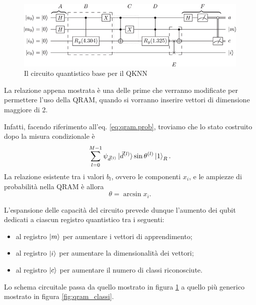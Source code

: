 \begin{figure}[h]
    \centering
    \includegraphics[width=\linewidth]{gfx/schuld_circuito}
    \caption{Il circuito quantistico base per il QKNN}
    \label{fig:circuito_schuld}
\end{figure}

La relazione appena mostrata è una delle prime che verranno modificate per permettere 
l'uso della \ac{QRAM}, quando si vorranno inserire vettori di dimensione maggiore di 2. 

Infatti, facendo riferimento all'eq. \ref{eq:qram.prob}, troviamo che lo stato costruito 
dopo la misura condizionale è 
\begin{equation}
    \sum_{l=0}^{M-1} \psi_{\vec{d}^{(l)}}\ket{\vec{d}^{(l)}}\sin\theta^{(l)}\ket{1}_R. 
\end{equation}
La relazione esistente tra i valori $b_l$, ovvero le componenti $x_i$, 
e le ampiezze di probabilità nella \ac{QRAM} è allora
\begin{equation} \label{eq:angolo.qram}
    \theta = \arcsin x_i. 
\end{equation}

L'espansione delle capacità del circuito prevede dunque l'aumento dei qubit 
dedicati a ciascun registro quantistico tra i seguenti: 
\begin{itemize}
    \item al registro $\ket{m}$ per aumentare i vettori di apprendimento; 
    \item al registro $\ket{i}$ per aumentare la dimensionalità dei vettori; 
    \item al registro $\ket{c}$ per aumentare il numero di classi riconosciute. 
\end{itemize}
Lo schema circuitale passa da quello mostrato in figura \ref{fig:circuito_schuld} a 
quello più generico mostrato in figura \ref{fig:qram_classi}. 


